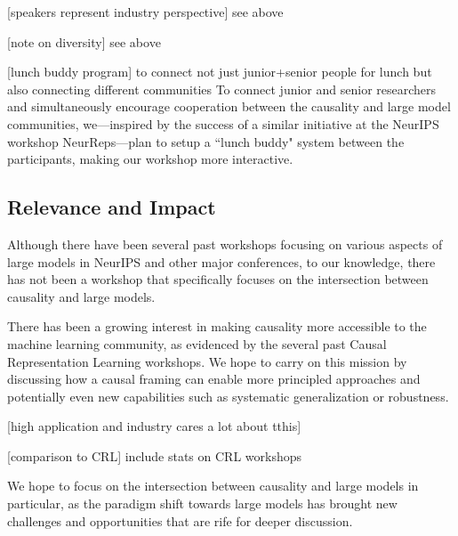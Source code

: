 \documentclass{article}
\begin{document}
[speakers represent industry perspective]
{\color{cyan} see above}

[note on diversity]
{\color{cyan} see above}



[lunch buddy program] to connect not just junior+senior people for lunch but also connecting different communities
    To connect junior and senior researchers and simultaneously encourage cooperation between the causality and large model communities, we---inspired by the success of a similar initiative at the NeurIPS workshop NeurReps---plan to setup a ``lunch buddy" system between the participants, making our workshop more interactive.


\subsection{Relevance and Impact}

Although there have been several past workshops focusing on various aspects of large models in NeurIPS and other major conferences, to our knowledge, there has not been a workshop that specifically focuses on the intersection between causality and large models.

There has been a growing interest in making causality more accessible to the machine learning community, as evidenced by the several past Causal Representation Learning workshops. We hope to carry on this mission by discussing how a causal framing can enable more principled approaches and potentially even new capabilities such as systematic generalization or robustness.

[high application and industry cares a lot about tthis]

[comparison to CRL] include stats on CRL workshops


We hope to focus on the intersection between causality and large models in particular, as the paradigm shift towards large models has brought new challenges and opportunities that are rife for deeper discussion.

\end{document}
